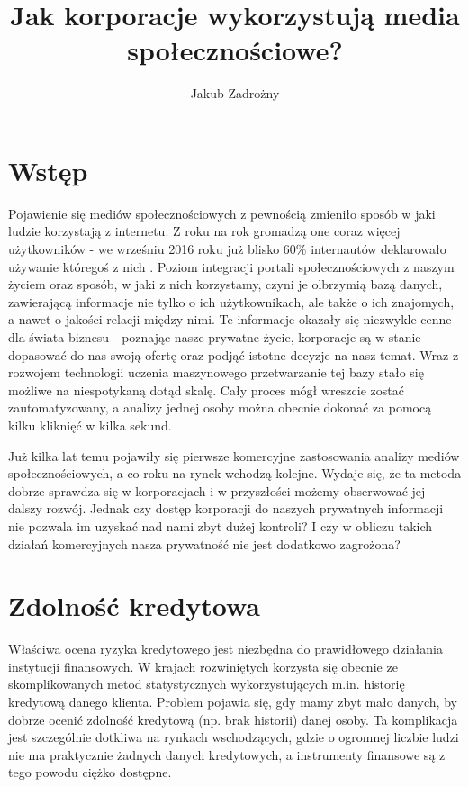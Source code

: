 \documentclass[polish]{kbk}
\begin{document}
\author{Jakub Zadrożny}
\title{Jak korporacje wykorzystują media społecznościowe?}

\maketitle

\section{Wstęp}
Pojawienie się mediów społecznościowych z pewnością zmieniło sposób w jaki ludzie korzystają z internetu. Z roku na rok gromadzą one coraz więcej użytkowników - we wrześniu 2016 roku już blisko 60\% internautów deklarowało używanie któregoś z nich \cite{stats}. Poziom integracji portali społecznościowych z naszym życiem oraz sposób, w jaki z nich korzystamy, czyni je olbrzymią bazą danych, zawierającą informacje nie tylko o ich użytkownikach, ale także o ich znajomych, a nawet o jakości relacji między nimi. Te informacje okazały się niezwykle cenne dla świata biznesu - poznając nasze prywatne życie, korporacje są w stanie dopasować do nas swoją ofertę oraz podjąć istotne decyzje na nasz temat. Wraz z rozwojem technologii uczenia maszynowego przetwarzanie tej bazy stało się możliwe na niespotykaną dotąd skalę. Cały proces mógł wreszcie zostać zautomatyzowany, a analizy jednej osoby można obecnie dokonać za pomocą kilku kliknięć w kilka sekund.

Już kilka lat temu pojawiły się pierwsze komercyjne zastosowania analizy mediów społecznościowych, a co roku na rynek wchodzą kolejne. Wydaje się, że ta metoda dobrze sprawdza się w korporacjach i w przyszłości możemy obserwować jej dalszy rozwój. Jednak czy dostęp korporacji do naszych prywatnych informacji nie pozwala im uzyskać nad nami zbyt dużej kontroli? I czy w obliczu takich działań komercyjnych nasza prywatność nie jest dodatkowo zagrożona?

\section{Zdolność kredytowa}
Właściwa ocena ryzyka kredytowego jest niezbędna do prawidłowego działania instytucji finansowych. W krajach rozwiniętych korzysta się obecnie ze skomplikowanych metod statystycznych wykorzystujących m.in. historię kredytową danego klienta. Problem pojawia się, gdy mamy zbyt mało danych, by dobrze ocenić zdolność kredytową (np. brak historii) danej osoby. Ta komplikacja jest szczególnie dotkliwa na rynkach wschodzących, gdzie o ogromnej liczbie ludzi nie ma praktycznie żadnych danych kredytowych, a instrumenty finansowe są z tego powodu ciężko dostępne. 
\end{document}
